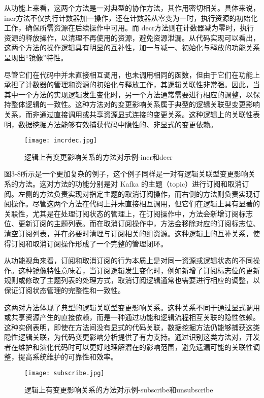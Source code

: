 从功能上来看，这两个方法是一对典型的协作方法，其作用密切相关。具体来说，incr方法不仅执行计数器加一操作，还在计数器从零变为一时，执行资源的初始化工作，确保所需资源在后续操作中可用。而 decr方法则在计数器减为零时，执行资源的释放操作，以清理不再使用的资源，避免资源泄漏。从代码实现可以看出，这两个方法的操作逻辑具有明显的互补性，加一与减一、初始化与释放的功能关系呈现出“镜像”特性。

尽管它们在代码中并未直接相互调用，也未调用相同的函数，但由于它们在功能上承担了计数器的管理和资源的初始化与释放工作，其逻辑关联性非常强。因此，当其中一个方法的实现逻辑发生变化时，另一个方法通常需要进行相应的调整，以保持整体逻辑的一致性。这种方法对的变更影响关系属于典型的逻辑关联型变更影响关系，而非通过直接调用或共享资源显式连接的变更关系。这种逻辑上的关联性表明，数据挖掘方法能够有效捕获代码中隐性的、非显式的变更依赖。

\begin{figure}[h]
\centering
\texttt{[image: incrdec.jpg]}
\caption{逻辑上有变更影响关系的方法对示例-incr和decr}
\end{figure}

图3-8所示是一个更加复杂的例子，这个例子同样是一对有逻辑关联型变更影响关系的方法。这对方法的功能分别是对 Kafka 的主题（topic）进行订阅和取消订阅。左侧的方法负责实现对指定主题的取消订阅操作，而右侧的方法则负责实现订阅操作。尽管这两个方法在代码上并未直接相互调用，但它们在逻辑上具有显著的关联性，尤其是在处理订阅状态的管理上，在订阅操作中，方法会新增订阅标志位、更新订阅的主题列表。而在取消订阅操作中，方法会移除对应的订阅标志位、清空订阅列表，并在必要时清理与订阅相关的组资源。这种逻辑上的互补关系，使得订阅和取消订阅操作形成了一个完整的管理闭环。

从功能视角来看，订阅和取消订阅的行为本质上是对同一资源或逻辑状态的不同操作。这种镜像特性意味着，当订阅逻辑发生变化时，例如新增了订阅标志位的更新规则或修改了主题列表的处理方式，取消订阅逻辑通常也需要进行相应的调整，以保证订阅状态管理的完整性和一致性。

这两对方法体现了典型的逻辑关联型变更影响关系。这种关系不同于通过显式调用或共享资源产生的直接依赖，而是一种通过功能和逻辑流程相互关联的隐性依赖。这种实例表明，即使在方法间没有显式的代码关联，数据挖掘方法仍能够捕获这类隐性逻辑关联，为代码变更影响分析提供了有力支持。通过识别这类方法对，开发者在维护和演化代码时可以更好地理解潜在的影响范围，避免遗漏可能的关联性调整，提高系统维护的可靠性和效率。

\begin{figure}[h]
\centering
\texttt{[image: subscribe.jpg]}
\caption{逻辑上有变更影响关系的方法对示例-subscribe和unsubscribe}
\end{figure}


